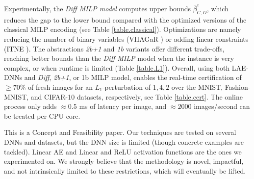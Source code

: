 Experimentally, the {\em Diff MILP model} computes upper bounds
$\bar{\beta}^{\varepsilon}_{C,D}$, which reduces the gap to the lower bound compared with the optimized versions of the classical MILP encoding (see Table \ref{table.classical}). Optimizations are namely reducing the number of binary variables (VHAGaR \cite{vhagar}) or adding linear constraints 
(ITNE \cite{ITNE}). The abstractions {\em 2b+1} and {\em 1b} variants offer different trade-offs, reaching better bounds than the {\em Diff MILP} model when the instance is very complex, or when runtime is limited (Table \ref{table.L1}).  
Overall, using both LAE-DNNs and {\em Diff}, {\em 2b+1}, or {1b}  MILP model, enables the real-time certification of $\geq 70\%$ of fresh images for an $L_1$-perturbation of $1,4,2$ over the MNIST, Fashion-MNIST, and CIFAR-10 datasets, respectively, see Table \ref{table.cert}. The online process only adds  $\approx 0.5$ ms of latency per image, and $\approx 2000$ images/second can be treated per CPU core.

This is a Concept and Feasibility paper. 
Our techniques are tested on several DNNs and datasets, but the DNN size is limited (though concrete examples are tackled). 
Linear AE and Linear and ReLU activation functions are the ones we experimented on. We strongly believe that the methodology is novel, impactful, and not intrinsically limited to these restrictions, which will eventually be lifted.